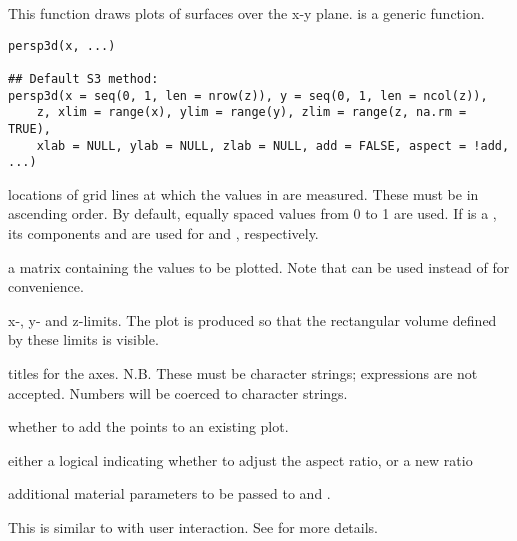 \begin{Description}\relax
This function draws plots of surfaces over the
x-y plane.  is a generic function.
\end{Description}
\begin{Usage}
\begin{verbatim}
persp3d(x, ...)

## Default S3 method:
persp3d(x = seq(0, 1, len = nrow(z)), y = seq(0, 1, len = ncol(z)),
    z, xlim = range(x), ylim = range(y), zlim = range(z, na.rm = TRUE),
    xlab = NULL, ylab = NULL, zlab = NULL, add = FALSE, aspect = !add, ...)
\end{verbatim}
\end{Usage}
\begin{Arguments}
\begin{ldescription}
\item[\code{x, y}] locations of grid lines at which the values in  are
measured.  These must be in ascending order.  By default, equally
spaced values from 0 to 1 are used.  If  is a ,
its components  and  are used for 
and , respectively.
\item[\code{z}] a matrix containing the values to be plotted.  
Note that  can be used instead of  for
convenience.
\item[\code{xlim, ylim, zlim}] x-, y-  and z-limits.  The plot is produced
so that the rectangular volume defined by these limits is visible.
\item[\code{xlab, ylab, zlab}] titles for the axes.  N.B. These must be
character strings; expressions are not accepted.  Numbers will be
coerced to character strings.
\item[\code{add}] whether to add the points to an existing plot.
\item[\code{aspect}] either a logical indicating whether to adjust the aspect ratio, or a new ratio
\item[\code{...}] additional material parameters to be passed to 
and .
\end{ldescription}
\end{Arguments}
\begin{Details}\relax
This is similar to  with user interaction.  See 
for more details.
\end{Details}
